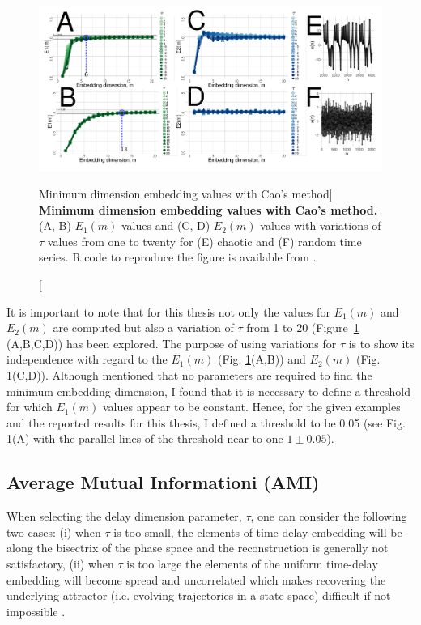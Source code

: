 \begin{figure}[!h]
  \centering
  \includegraphics[width=1.0\textwidth]{fig_3_03}
    \caption
	[Minimum dimension embedding values with Cao's method]{
	{\bf Minimum dimension embedding values with Cao's method.} 
	(A, B) $E_1 (m)$ values and (C, D) $E_2(m)$ values 
	with variations of $\tau$ values from one to twenty
	for (E) chaotic and (F) random time series.
	R code to reproduce the figure is available from \cite{xochicale2018}.
        }
    \label{fig:e1e2}
\end{figure}

It is important to note that for this thesis not only the values for 
$E_1(m)$ and $E_2(m)$ are computed but also a variation of $\tau$ from 
1 to 20 (Figure~\ref{fig:e1e2} (A,B,C,D)) has been explored. 
The purpose of using variations for $\tau$ is to show its independence 
with regard to the $E_1(m)$ (Fig. \ref{fig:e1e2}(A,B))
and $E_2(m)$ (Fig. \ref{fig:e1e2}(C,D)).
Although \cite{Cao1997} mentioned that no parameters are required to find
the minimum embedding dimension, I found that it is necessary to define a  
threshold for which $E_1(m)$ values appear to be constant. 
Hence, for the given examples and the reported results for this thesis, 
I defined a threshold to be 0.05 
(see Fig. \ref{fig:e1e2}(A) with the parallel lines of the threshold 
near to one $1\pm0.05$).

\subsection{Average Mutual Informationi (AMI)}
When selecting the delay dimension parameter, $\tau$, one can consider the 
following two cases:
(i) when $\tau$ is too small, the elements of time-delay embedding will be 
along the bisectrix of the phase space and the reconstruction is generally 
not satisfactory, 
(ii) when $\tau$ is too large the elements of the uniform 
time-delay embedding will become spread and uncorrelated which makes 
recovering the underlying attractor (i.e. evolving trajectories in a 
state space) difficult if not impossible 
\citep{casdagli1991, emrani2014a, garcia2005e71}.


